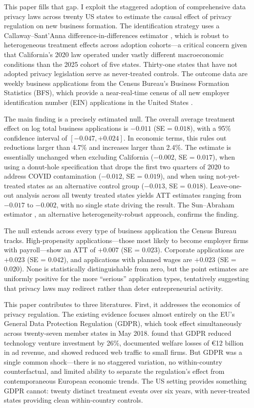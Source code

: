 \documentclass[12pt]{article}
\begin{document}
This paper fills that gap. I exploit the staggered adoption of comprehensive data privacy laws across twenty US states to estimate the causal effect of privacy regulation on new business formation. The identification strategy uses a Callaway--Sant'Anna difference-in-differences estimator \citep{callaway2021}, which is robust to heterogeneous treatment effects across adoption cohorts---a critical concern given that California's 2020 law operated under vastly different macroeconomic conditions than the 2025 cohort of five states. Thirty-one states that have not adopted privacy legislation serve as never-treated controls. The outcome data are weekly business applications from the Census Bureau's Business Formation Statistics (BFS), which provide a near-real-time census of all new employer identification number (EIN) applications in the United States \citep{bayard2018}.

The main finding is a precisely estimated null. The overall average treatment effect on log total business applications is $-0.011$ (SE = $0.018$), with a 95\% confidence interval of $[-0.047, +0.024]$. In economic terms, this rules out reductions larger than 4.7\% and increases larger than 2.4\%. The estimate is essentially unchanged when excluding California ($-0.002$, SE = $0.017$), when using a donut-hole specification that drops the first two quarters of 2020 to address COVID contamination ($-0.012$, SE = $0.019$), and when using not-yet-treated states as an alternative control group ($-0.013$, SE = $0.018$). Leave-one-out analysis across all twenty treated states yields ATT estimates ranging from $-0.017$ to $-0.002$, with no single state driving the result. The Sun--Abraham estimator \citep{sun2021}, an alternative heterogeneity-robust approach, confirms the finding.

The null extends across every type of business application the Census Bureau tracks. High-propensity applications---those most likely to become employer firms with payroll---show an ATT of $+0.007$ (SE = $0.023$). Corporate applications are $+0.023$ (SE = $0.042$), and applications with planned wages are $+0.023$ (SE = $0.020$). None is statistically distinguishable from zero, but the point estimates are uniformly positive for the more ``serious'' application types, tentatively suggesting that privacy laws may redirect rather than deter entrepreneurial activity.

This paper contributes to three literatures. First, it addresses the economics of privacy regulation. The existing evidence focuses almost entirely on the EU's General Data Protection Regulation (GDPR), which took effect simultaneously across twenty-seven member states in May 2018. \citet{jia2021} found that GDPR reduced technology venture investment by 26\%, \citet{goldberg2024} documented welfare losses of \euro 12 billion in ad revenue, and \citet{peukert2022} showed reduced web traffic to small firms. But GDPR was a single common shock---there is no staggered variation, no within-country counterfactual, and limited ability to separate the regulation's effect from contemporaneous European economic trends. The US setting provides something GDPR cannot: twenty distinct treatment events over six years, with never-treated states providing clean within-country controls.
\end{document}
